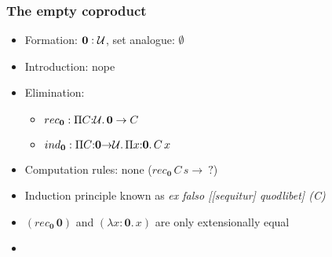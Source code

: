 \documentclass[handout]{beamer}
\newcommand{\depi}[3]{\Pi{#1{:}#2.\,#3}}
\newcommand{\lamt}[3]{\lambda{#1{:}#2.\,#3}}
\newcommand{\UU}{{\cal U}}
\newcommand{\bfnull}{\mathbf{0}}
\begin{document}
\frame
  {
  
    \frametitle{The empty coproduct}

    \begin{itemize}[<+->]
    \item Formation:  $\bfnull:\UU$, set analogue: $\emptyset$
    \item Introduction: nope
    \item Elimination:
      \begin{itemize}[<+->]
      \item $rec_\bfnull : \depi{C}{\UU}{\bfnull \to C}$ 
      \item $ind_\bfnull : \depi{C}{\bfnull{\to}\UU}{\depi{x}{\bfnull}{C\,x}}$
      \end{itemize}  
    \item Computation rules: none ($rec_\bfnull\,C\,s \to ~?$)
    \item Induction principle known as \emph{ex falso [[sequitur] quodlibet] (C)}
    \item $(rec_\bfnull\,\bfnull)$ and $(\lamt{x}{\bfnull}{x})$ are only extensionally equal
    \item 
    \end{itemize}
  }
\end{document}
